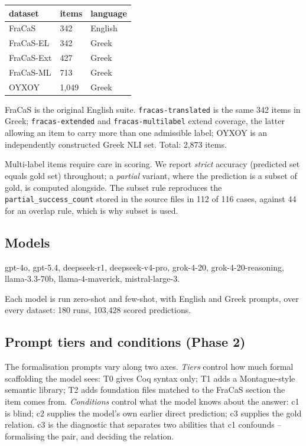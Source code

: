 \documentclass[11pt]{article}
\begin{document}
\begin{center}
\begin{tabular}{lll}
\hline
dataset & items & language \\
\hline
FraCaS & 342 & English \\
FraCaS-EL & 342 & Greek \\
FraCaS-Ext & 427 & Greek \\
FraCaS-ML & 713 & Greek \\
OYXOY & 1,049 & Greek \\
\hline
\end{tabular}
\end{center}FraCaS is the original English suite. \texttt{fracas-translated} is the same
342 items in Greek; \texttt{fracas-extended} and
\texttt{fracas-multilabel} extend coverage, the latter allowing an item to carry
more than one admissible label; OYXOY is an independently constructed
Greek NLI set. Total: 2,873 items.

Multi-label items require care in scoring. We report \emph{strict} accuracy
(predicted set equals gold set) throughout; a \emph{partial} variant, where the
prediction is a subset of gold, is computed alongside. The subset rule
reproduces the \texttt{partial\_success_count} stored in the source files in 112 of
116 cases, against 44 for an overlap rule, which is why subset is used.

\subsection{Models}

gpt-4o, gpt-5.4, deepseek-r1, deepseek-v4-pro, grok-4-20, grok-4-20-reasoning, llama-3.3-70b, llama-4-maverick, mistral-large-3.

Each model is run zero-shot and few-shot, with English and Greek prompts,
over every dataset: 180 runs, 103,428
scored predictions.

\subsection{Prompt tiers and conditions (Phase 2)}

The formalisation prompts vary along two axes. \emph{Tiers} control how much
formal scaffolding the model sees: T0 gives Coq syntax only; T1 adds a
Montague-style semantic library; T2 adds foundation files matched to the
FraCaS section the item comes from. \emph{Conditions} control what the model
knows about the answer: c1 is blind; c2 supplies the model's own earlier
direct prediction; c3 supplies the gold relation. c3 is the diagnostic
that separates two abilities that c1 confounds -- formalising the pair,
and deciding the relation.
\end{document}
